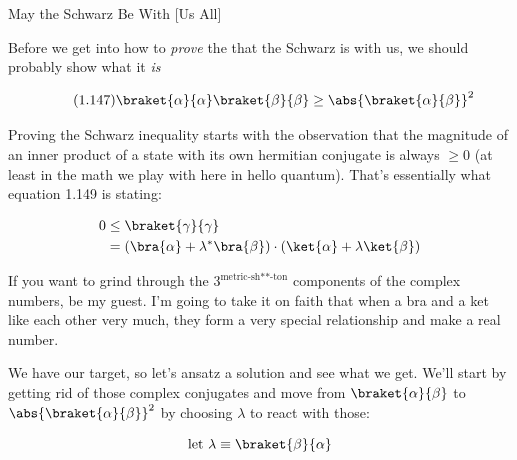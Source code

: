 \begin{answer}

  \begin{answerpart}{May the Schwarz Be With [Us All]}

    Before we get into how to \emph{prove} the that the Schwarz is
    with us, we should probably show what it \emph{is}

    \begin{equation}
      \tag{1.147}
      \braket{\alpha}{\alpha}\braket{\beta}{\beta}
      \ge \abs{\braket{\alpha}{\beta}}^2
    \end{equation}
    
    Proving the Schwarz inequality starts with the observation that
    the magnitude of an inner product of a state with its own
    hermitian conjugate is always $\ge 0$ (at least in the math we
    play with here in hello quantum).  That's essentially what
    equation 1.149 is stating:

    \begin{equation}
      \begin{split}
        0
        &\le \braket{\gamma}{\gamma}
        \\
        &= \left(
        \bra{\alpha} + \lambda^{*}\bra{\beta} \right)
        \cdot
        \left( \ket{\alpha} + \lambda\ket{\beta} \right)
        \\
      \end{split}
    \end{equation}

    If you want to grind through the $3^{\text{metric-sh**-ton}}$
    components of the complex numbers, be my guest.  I'm going to take
    it on faith that when a bra and a ket like each other very much,
    they form a very special relationship and make a real number.

    We have our target, so let's ansatz a solution and see what we
    get.  We'll start by getting rid of those complex conjugates and
    move from $\braket{\alpha}{\beta}$ to
    $\abs{\braket{\alpha}{\beta}}^2$ by choosing $\lambda$ to react
    with those:

    \begin{equation}
      \text{let } \lambda \equiv \braket{\beta}{\alpha}
    \end{equation}


\end{answerpart}
\end{answer}
